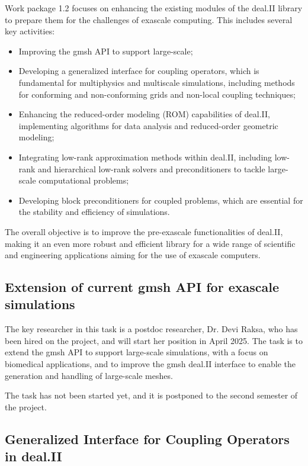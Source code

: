 \documentclass[a4paper,12pt]{article}
\begin{document}
Work package 1.2 focuses on enhancing the existing modules of the deal.II
library to prepare them for the challenges of exascale computing. This includes
several key activities: 
\begin{itemize}
    \item Improving the gmsh API to support large-scale;
    \item Developing a generalized interface for coupling operators, which
    is fundamental for multiphysics and multiscale simulations, including methods
    for conforming and non-conforming grids and non-local coupling techniques;
    \item Enhancing the reduced-order modeling (ROM) capabilities of deal.II,
    implementing algorithms for data analysis and reduced-order geometric modeling;
    \item Integrating low-rank approximation methods within deal.II, including
    low-rank and hierarchical low-rank solvers and preconditioners to tackle
    large-scale computational problems;
    \item Developing block preconditioners for coupled problems, which are
    essential for the stability and efficiency of simulations.
\end{itemize}
 
The overall objective is to improve the pre-exascale functionalities of deal.II,
making it an even more robust and efficient library for a wide range of
scientific and engineering applications aiming for the use of exascale
computers.

\subsection{Extension of current gmsh API for exascale simulations}
    The key researcher in this task is a postdoc researcher, Dr. Devi Raksa, who
    has been hired on the project, and will start her position in April 2025.
    The task is to extend the gmsh API to support large-scale simulations, with
    a focus on biomedical applications, and to improve the gmsh deal.II
    interface to enable the generation and handling of large-scale meshes.

    The task has not been started yet, and it is postponed to the second
    semester of the project.

\subsection{Generalized Interface for Coupling Operators in deal.II}
\end{document}
